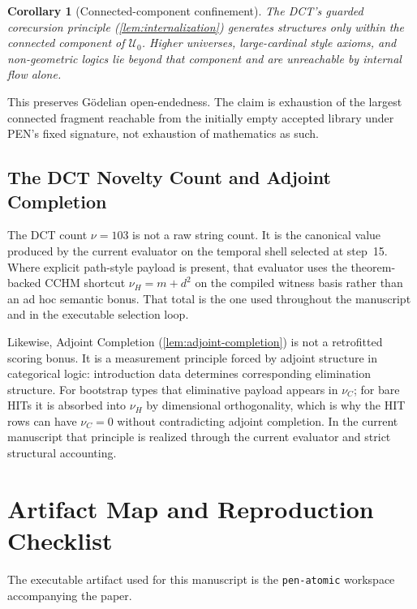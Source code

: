 \documentclass[11pt,a4paper]{article}
\theoremstyle{plain}
\newtheorem{corollary}[theorem]{Corollary}
\theoremstyle{definition}
\theoremstyle{remark}
\newcommand{\U}{\mathcal{U}}
\begin{document}
\begin{corollary}[Connected-component confinement]
\label{cor:confinement}
The DCT's guarded corecursion principle (\cref{lem:internalization}) generates structures only within the connected component of $\U_0$.
Higher universes, large-cardinal style axioms, and non-geometric logics lie beyond that component and are unreachable by internal flow alone.
\end{corollary}

This preserves G\"odelian open-endedness.
The claim is exhaustion of the largest connected fragment reachable from the initially empty accepted library under PEN's fixed signature, not exhaustion of mathematics as such.

\subsection{The DCT Novelty Count and Adjoint Completion}
\label{sec:adjoint-completion}

The DCT count $\nu=103$ is not a raw string count.
It is the canonical value produced by the current evaluator on the temporal shell selected at step~15.
Where explicit path-style payload is present, that evaluator uses the theorem-backed CCHM shortcut $\nu_H=m+d^2$ on the compiled witness basis rather than an ad hoc semantic bonus.
That total is the one used throughout the manuscript and in the executable selection loop.

Likewise, Adjoint Completion (\cref{lem:adjoint-completion}) is not a retrofitted scoring bonus.
It is a measurement principle forced by adjoint structure in categorical logic: introduction data determines corresponding elimination structure.
For bootstrap types that eliminative payload appears in $\nu_C$; for bare HITs it is absorbed into $\nu_H$ by dimensional orthogonality, which is why the HIT rows can have $\nu_C=0$ without contradicting adjoint completion.
In the current manuscript that principle is realized through the current evaluator and strict structural accounting.

\section{Artifact Map and Reproduction Checklist}
\label{app:artifact-map}

The executable artifact used for this manuscript is the \texttt{pen-atomic} workspace accompanying the paper.
\end{document}
